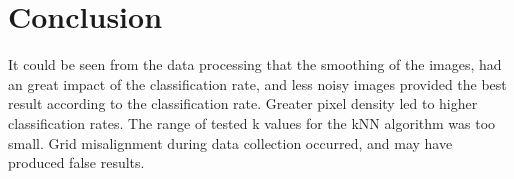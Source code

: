 \chapter{Conclusion}
It could be seen from the data processing
that the smoothing of the images,
had an great impact of the classification rate,
and  less noisy images provided the best result according to the classification rate.
Greater pixel density led to higher classification rates.
The range of tested k values for the kNN algorithm was too small.
Grid misalignment during data collection occurred, and may have produced false results.
